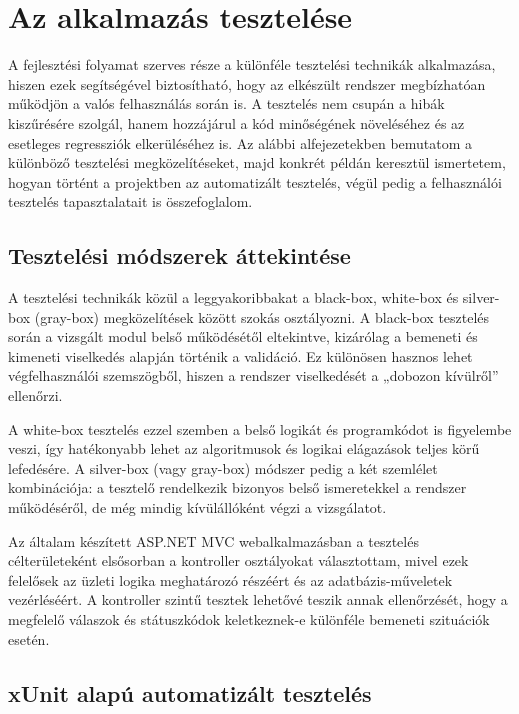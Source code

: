 \section{Az alkalmazás tesztelése}

A fejlesztési folyamat szerves része a különféle tesztelési technikák alkalmazása, hiszen ezek segítségével biztosítható, hogy az elkészült rendszer megbízhatóan működjön a valós felhasználás során is. A tesztelés nem csupán a hibák kiszűrésére szolgál, hanem hozzájárul a kód minőségének növeléséhez és az esetleges regressziók elkerüléséhez is. Az alábbi alfejezetekben bemutatom a különböző tesztelési megközelítéseket, majd konkrét példán keresztül ismertetem, hogyan történt a projektben az automatizált tesztelés, végül pedig a felhasználói tesztelés tapasztalatait is összefoglalom.

\subsection{Tesztelési módszerek áttekintése}

A tesztelési technikák közül a leggyakoribbakat a black-box, white-box és silver-box (gray-box) megközelítések között szokás osztályozni. A black-box tesztelés során a vizsgált modul belső működésétől eltekintve, kizárólag a bemeneti és kimeneti viselkedés alapján történik a validáció. Ez különösen hasznos lehet végfelhasználói szemszögből, hiszen a rendszer viselkedését a „dobozon kívülről” ellenőrzi.

A white-box tesztelés ezzel szemben a belső logikát és programkódot is figyelembe veszi, így hatékonyabb lehet az algoritmusok és logikai elágazások teljes körű lefedésére. A silver-box (vagy gray-box) módszer pedig a két szemlélet kombinációja: a tesztelő rendelkezik bizonyos belső ismeretekkel a rendszer működéséről, de még mindig kívülállóként végzi a vizsgálatot.

Az általam készített ASP.NET MVC webalkalmazásban a tesztelés célterületeként elsősorban a kontroller osztályokat választottam, mivel ezek felelősek az üzleti logika meghatározó részéért és az adatbázis-műveletek vezérléséért. A kontroller szintű tesztek lehetővé teszik annak ellenőrzését, hogy a megfelelő válaszok és státuszkódok keletkeznek-e különféle bemeneti szituációk esetén.

\subsection{xUnit alapú automatizált tesztelés}

